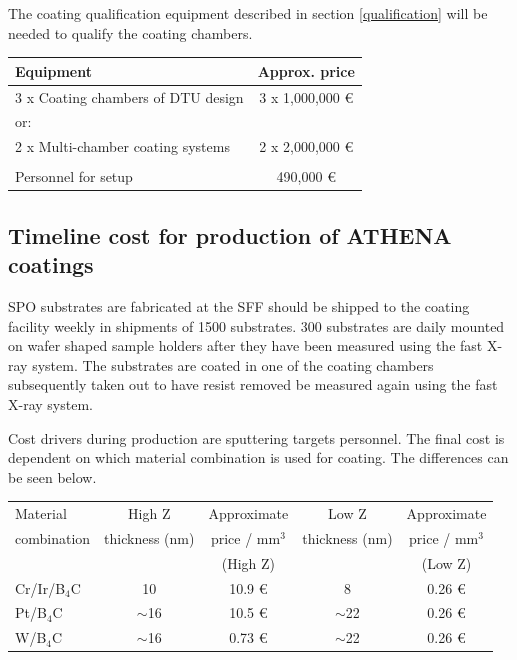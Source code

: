 The coating qualification equipment described in section \ref{qualification} will be needed to qualify the coating chambers.


\begin{table}[htbp]
	\centering
\begin{tabular}{l|c}
Equipment & Approx. price \\
\hline
\hline
3 x Coating chambers of DTU design  & 3 x 1,000,000 \euro\\
\hline
or:\\
\hline
2 x Multi-chamber coating systems & 2 x 2,000,000 \euro \\
\hline
\\
\hline
Personnel for setup & 490,000 \euro\\
\end{tabular}
\end{table}


\subsection{Timeline cost for production of ATHENA coatings}
SPO substrates are fabricated at the SFF should be shipped to the coating facility weekly in shipments of 1500 substrates. 300 substrates are daily mounted on wafer shaped sample holders after they have been measured using the fast X-ray system. The substrates are coated in one of the coating chambers subsequently taken out to have resist removed be measured again using the fast X-ray system.

Cost drivers during production are sputtering targets personnel. The final cost is dependent on which material combination is used for coating. The differences can be seen below.

\begin{table}[htbp]
	\centering
\begin{tabular}{l|c|c|c|c}
Material 	& High Z 		& Approximate & Low Z  & Approximate \\
combination & thickness (nm) & price / mm$^3$ & thickness (nm) &  price / mm$^3$ \\
	&	& (High Z) &	& (Low Z) \\
\hline
\hline
Cr/Ir/B$_4$C & 10 & 10.9 \euro & 8 & 0.26 \euro\\
\hline
Pt/B$_4$C & $\sim$16 & 10.5 \euro & $\sim$22 & 0.26 \euro\\
\hline
W/B$_4$C & $\sim$16 & 0.73 \euro & $\sim$22 & 0.26 \euro\\
\end{tabular}
\end{table}

